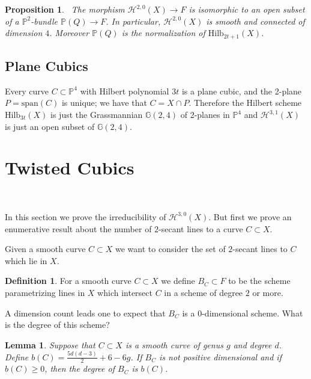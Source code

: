 \documentclass[twoside,12pt,reqno]{amsart}
\theoremstyle{plain}
\newtheorem{lem}[thm]{Lemma}
\newtheorem{prop}[thm]{Proposition}
\theoremstyle{definition}
\newtheorem{defn}[thm]{Definition}
\newcommand{\Hdg}[2]{\mathcal{H}^{#1,#2}}
\newcommand{\PP}{\mathbb{P}}
\newcommand{\HI}[2]{\text{Hilb}_{#1}(#2)}
\def\ps{\vspace{4pt}}
\begin{document}
\ps

\begin{prop}~\label{prop-cons1}  The morphism
$\Hdg{2}{0}(X)\rightarrow F$ is isomorphic to an open subset of a
$\PP^2$-bundle $\PP(Q)\rightarrow F$.  In particular, $\Hdg{2}{0}(X)$
is smooth and connected of dimension $4$.  Moreover $\PP(Q)$ is the
normalization of $\HI{2t+1}{X}$.  
\end{prop}


\subsection{Plane Cubics}\label{sec-pcubs}

Every curve $C\subset \PP^4$ with Hilbert polynomial $3t$ is a plane
cubic, and the 2-plane $P=\text{span}(C)$ is unique; we have
that $C=X\cap P$.  Therefore the Hilbert scheme $\HI{3t}{X}$ is just
the Grassmannian $\mathbb{G}(2,4)$ of 2-planes in $\PP^4$ and
$\Hdg{3}{1}(X)$ is just an open subset of $\mathbb{G}(2,4)$.    

\section{Twisted Cubics}~\label{sec-30}

In this section we prove the irreducibility of $\Hdg{3}{0}(X)$. 
But first we prove an enumerative result about the number of
$2$-secant lines to a curve $C\subset X$.

\ps

Given a smooth curve $C\subset X$ we want to consider the set of
$2$-secant lines to $C$ which lie in $X$.

\begin{defn}
For a smooth curve $C\subset X$ we define $B_C\subset F$ to be the
scheme parametrizing lines in $X$ which intersect $C$ in a scheme of
degree $2$ or more.
\end{defn}

A dimension count leads one to expect that $B_C$ is a $0$-dimensional
scheme.  What is the degree of this scheme?

\begin{lem}\label{lem-enum}  Suppose that $C\subset X$ is a smooth
curve of genus $g$ 
and degree $d$.  
Define $b(C)=\frac{5d(d-3)}{2}+6-6g$.  If
$B_C$ is not positive dimensional and if $b(C)\geq 0$, then the degree of
$B_C$ is $b(C)$.  
\end{lem}
\end{document}
